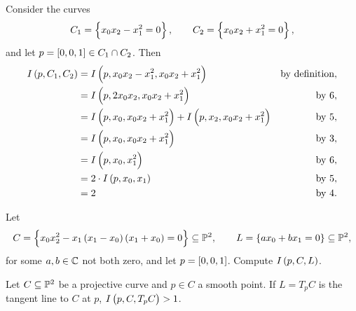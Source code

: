 \pagebreak

\begin{example}
Consider the curves
$$ C_1 = \cbr{x_0x_2 - x_1^2 = 0}, \qquad C_2 = \cbr{x_0x_2 + x_1^2 = 0}, $$
and let $ p = \sbr{0, 0, 1} \in C_1 \cap C_2 $. Then
\begin{align*}
I\br{p, C_1, C_2}
& = I\br{p, x_0x_2 - x_1^2, x_0x_2 + x_1^2} & \text{by definition}, \\
& = I\br{p, 2x_0x_2, x_0x_2 + x_1^2} & \text{by} \ 6, \\
& = I\br{p, x_0, x_0x_2 + x_1^2} + I\br{p, x_2, x_0x_2 + x_1^2} & \text{by} \ 5, \\
& = I\br{p, x_0, x_0x_2 + x_1^2} & \text{by} \ 3, \\
& = I\br{p, x_0, x_1^2} & \text{by} \ 6, \\
& = 2 \cdot I\br{p, x_0, x_1} & \text{by} \ 5, \\
& = 2 & \text{by} \ 4.
\end{align*}
\end{example}


\begin{exercise}
Let
$$ C = \cbr{x_0x_2^2 - x_1\br{x_1 - x_0}\br{x_1 + x_0} = 0} \subseteq \P^2, \qquad L = \cbr{ax_0 + bx_1 = 0} \subseteq \P^2, $$
for some $ a, b \in \C $ not both zero, and let $ p = \sbr{0, 0, 1} $. Compute $ I\br{p, C, L} $.
\end{exercise}

\begin{proposition}
Let $ C \subseteq \P^2 $ be a projective curve and $ p \in C $ a smooth point. If $ L = T_pC $ is the tangent line to $ C $ at $ p $, $ I\br{p, C, T_pC} > 1 $.
\end{proposition}

